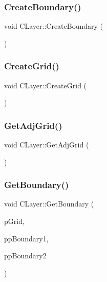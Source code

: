 \mbox{\label{classCLayer_ab33982ec157f1aa3fd4543a160574a1a}} 
\subsubsection{\texorpdfstring{CreateBoundary()}{CreateBoundary()}}
{\footnotesize\ttfamily void C\+Layer\+::\+Create\+Boundary (\begin{DoxyParamCaption}{ }\end{DoxyParamCaption})}

\mbox{\label{classCLayer_a6d9a84c543b8c2b4f5fd555d24a567f2}} 
\subsubsection{\texorpdfstring{CreateGrid()}{CreateGrid()}}
{\footnotesize\ttfamily void C\+Layer\+::\+Create\+Grid (\begin{DoxyParamCaption}{ }\end{DoxyParamCaption})}

\mbox{\label{classCLayer_aa7ddbec19acf0970615b187540d6bad0}} 
\subsubsection{\texorpdfstring{GetAdjGrid()}{GetAdjGrid()}}
{\footnotesize\ttfamily void C\+Layer\+::\+Get\+Adj\+Grid (\begin{DoxyParamCaption}{ }\end{DoxyParamCaption})}

\mbox{\label{classCLayer_a38b1b0ee3e7884ef63fd439070c37e17}} 
\subsubsection{\texorpdfstring{GetBoundary()}{GetBoundary()}\hspace{0.1cm}{\footnotesize\ttfamily [1/5]}}
{\footnotesize\ttfamily void C\+Layer\+::\+Get\+Boundary (\begin{DoxyParamCaption}\item[{\mbox{\hyperlink{classCGrid}{C\+Grid}} $\ast$}]{p\+Grid,  }\item[{\mbox{\hyperlink{classCBoundary}{C\+Boundary}} $\ast$$\ast$}]{pp\+Boundary1,  }\item[{\mbox{\hyperlink{classCBoundary}{C\+Boundary}} $\ast$$\ast$}]{pp\+Boundary2 }\end{DoxyParamCaption})}

